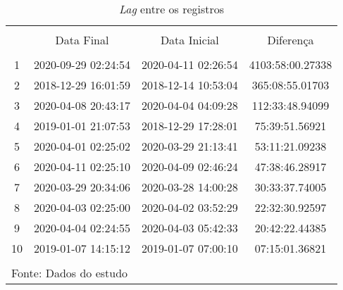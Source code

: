 
\begin{table}[h] \centering 
  \caption{ \textit{Lag} entre os registros} 
  \label{lag} 
\small 
\begin{tabular}{@{\extracolsep{5pt}} cccc} 
\\[-1.8ex]\hline 
\hline \\[-1.8ex] 
 & Data Final & Data Inicial & Diferença \\ 
\hline \\[-1.8ex] 
1 & 2020-09-29 02:24:54 & 2020-04-11 02:26:54 & 4103:58:00.27338 \\ 
2 & 2018-12-29 16:01:59 & 2018-12-14 10:53:04 & 365:08:55.01703 \\ 
3 & 2020-04-08 20:43:17 & 2020-04-04 04:09:28 & 112:33:48.94099 \\ 
4 & 2019-01-01 21:07:53 & 2018-12-29 17:28:01 & 75:39:51.56921 \\ 
5 & 2020-04-01 02:25:02 & 2020-03-29 21:13:41 & 53:11:21.09238 \\ 
6 & 2020-04-11 02:25:10 & 2020-04-09 02:46:24 & 47:38:46.28917 \\ 
7 & 2020-03-29 20:34:06 & 2020-03-28 14:00:28 & 30:33:37.74005 \\ 
8 & 2020-04-03 02:25:00 & 2020-04-02 03:52:29 & 22:32:30.92597 \\ 
9 & 2020-04-04 02:24:55 & 2020-04-03 05:42:33 & 20:42:22.44385 \\ 
10 & 2019-01-07 14:15:12 & 2019-01-07 07:00:10 & 07:15:01.36821 \\ 
\hline \\[-1.8ex] 
\multicolumn{4}{l}{Fonte: Dados do estudo} \\ 
\end{tabular} 
\end{table} 

